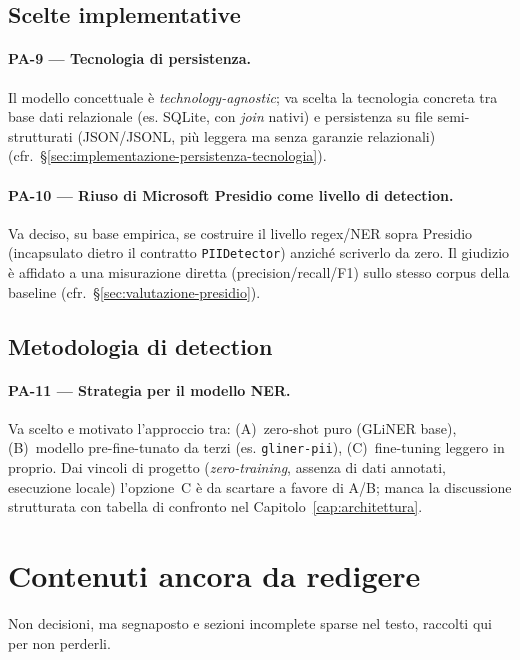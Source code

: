 \subsection{Scelte implementative}
\label{sub:pa-implementazione}

\paragraph{PA-9 — Tecnologia di persistenza.} Il modello concettuale è \emph{technology-agnostic}; va scelta la tecnologia concreta tra base dati relazionale (es. SQLite, con \emph{join} nativi) e persistenza su file semi-strutturati (JSON/JSONL, più leggera ma senza garanzie relazionali) (cfr.~§\ref{sec:implementazione-persistenza-tecnologia}).

\paragraph{PA-10 — Riuso di Microsoft Presidio come livello di detection.} Va deciso, su base empirica, se costruire il livello regex/NER sopra Presidio (incapsulato dietro il contratto \texttt{PIIDetector}) anziché scriverlo da zero. Il giudizio è affidato a una misurazione diretta (precision/recall/F1) sullo stesso corpus della baseline (cfr.~§\ref{sec:valutazione-presidio}).

\subsection{Metodologia di detection}
\label{sub:pa-metodologia}

\paragraph{PA-11 — Strategia per il modello NER.} Va scelto e motivato l'approccio tra: (A)~zero-shot puro (GLiNER base), (B)~modello pre-fine-tunato da terzi (es. \texttt{gliner-pii}), (C)~fine-tuning leggero in proprio. Dai vincoli di progetto (\emph{zero-training}, assenza di dati annotati, esecuzione locale) l'opzione~C è da scartare a favore di A/B; manca la discussione strutturata con tabella di confronto nel Capitolo~\ref{cap:architettura}.

\section{Contenuti ancora da redigere}
\label{sec:pa-contenuti}

Non decisioni, ma segnaposto e sezioni incomplete sparse nel testo, raccolti qui per non perderli.

